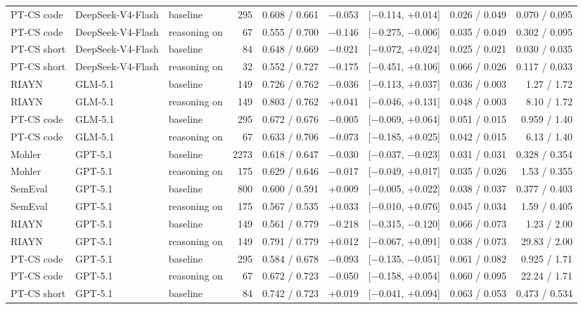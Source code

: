 \documentclass[10pt]{article}
\begin{document}
\begin{longtable}{lllrrrlrr}
PT-CS code & DeepSeek-V4-Flash & baseline & 295 & 0.608 / 0.661 & $-$0.053 & [$-$0.114, +0.014] & 0.026 / 0.049 & 0.070 / 0.095 \\
PT-CS code & DeepSeek-V4-Flash & reasoning on & 67 & 0.555 / 0.700 & $-$0.146 & [$-$0.275, $-$0.006] & 0.035 / 0.049 & 0.302 / 0.095 \\
PT-CS short & DeepSeek-V4-Flash & baseline & 84 & 0.648 / 0.669 & $-$0.021 & [$-$0.072, +0.024] & 0.025 / 0.021 & 0.030 / 0.035 \\
PT-CS short & DeepSeek-V4-Flash & reasoning on & 32 & 0.552 / 0.727 & $-$0.175 & [$-$0.451, +0.106] & 0.066 / 0.026 & 0.117 / 0.033 \\
RIAYN & GLM-5.1 & baseline & 149 & 0.726 / 0.762 & $-$0.036 & [$-$0.113, +0.037] & 0.036 / 0.003 & 1.27 / 1.72 \\
RIAYN & GLM-5.1 & reasoning on & 149 & 0.803 / 0.762 & +0.041 & [$-$0.046, +0.131] & 0.048 / 0.003 & 8.10 / 1.72 \\
PT-CS code & GLM-5.1 & baseline & 295 & 0.672 / 0.676 & $-$0.005 & [$-$0.069, +0.064] & 0.051 / 0.015 & 0.959 / 1.40 \\
PT-CS code & GLM-5.1 & reasoning on & 67 & 0.633 / 0.706 & $-$0.073 & [$-$0.185, +0.025] & 0.042 / 0.015 & 6.13 / 1.40 \\
Mohler & GPT-5.1 & baseline & 2273 & 0.618 / 0.647 & $-$0.030 & [$-$0.037, $-$0.023] & 0.031 / 0.031 & 0.328 / 0.354 \\
Mohler & GPT-5.1 & reasoning on & 175 & 0.629 / 0.646 & $-$0.017 & [$-$0.049, +0.017] & 0.035 / 0.026 & 1.53 / 0.355 \\
SemEval & GPT-5.1 & baseline & 800 & 0.600 / 0.591 & +0.009 & [$-$0.005, +0.022] & 0.038 / 0.037 & 0.377 / 0.403 \\
SemEval & GPT-5.1 & reasoning on & 175 & 0.567 / 0.535 & +0.033 & [$-$0.010, +0.076] & 0.045 / 0.034 & 1.59 / 0.405 \\
RIAYN & GPT-5.1 & baseline & 149 & 0.561 / 0.779 & $-$0.218 & [$-$0.315, $-$0.120] & 0.066 / 0.073 & 1.23 / 2.00 \\
RIAYN & GPT-5.1 & reasoning on & 149 & 0.791 / 0.779 & +0.012 & [$-$0.067, +0.091] & 0.038 / 0.073 & 29.83 / 2.00 \\
PT-CS code & GPT-5.1 & baseline & 295 & 0.584 / 0.678 & $-$0.093 & [$-$0.135, $-$0.051] & 0.061 / 0.082 & 0.925 / 1.71 \\
PT-CS code & GPT-5.1 & reasoning on & 67 & 0.672 / 0.723 & $-$0.050 & [$-$0.158, +0.054] & 0.060 / 0.095 & 22.24 / 1.71 \\
PT-CS short & GPT-5.1 & baseline & 84 & 0.742 / 0.723 & +0.019 & [$-$0.041, +0.094] & 0.063 / 0.053 & 0.473 / 0.534 \\

\end{longtable}
\end{document}
